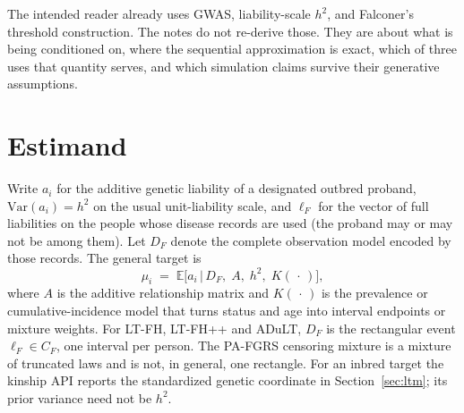 \documentclass[11pt,a4paper]{article}
\newcommand{\E}{\mathbb{E}}
\newcommand{\Var}{\mathrm{Var}}
\newcommand{\h}{h^{2}}
\begin{document}
\begin{abstract}
The association and personalisation figures describe optimistic,
model-specific scenarios, not proved upper bounds for register data:
a pin-versus-interval ablation keeps almost all of
the onset increment except at high prevalence, and pinning is
calibrated only when onset is the CIP inverse of liability.
They are not estimates of clinical utility.
On the locked comparison to the two public R packages
(Section~\ref{sec:ltfhplus}), ltpred is much more computationally
efficient at the same algorithm: LTFHPlus Gibbs takes
$6.79\pm 0.08\times$ the ltpred Gibbs wall-clock with four ltpred threads
against one R worker ($1.75\times$ at one thread each), and LTFGRS PA
takes $1418\pm 30\times$ the ltpred PA wall-clock.
\end{abstract}

\vspace{0.4em}
\noindent
The intended reader already uses GWAS, liability-scale \(\h\), and
Falconer's threshold construction. The notes do not re-derive those.
They are about what is being conditioned on, where the sequential
approximation is exact, which of three uses that quantity serves,
and which simulation claims survive their generative assumptions.

\section{Estimand}
\label{sec:estimand}

Write $a_i$ for the additive genetic liability of a designated
outbred proband, $\Var(a_i)=\h$ on the usual unit-liability scale, and
$\ell_F$ for the vector of full liabilities on the people whose
disease records are used (the proband may or may not be among them).
Let $D_F$ denote the complete observation model encoded by those
records. The general target is
\begin{equation}
  \mu_i
  \;=\;
  \E\!\bigl[a_i \,\big|\, D_F,\; A,\; \h,\; K(\,\cdot\,)\bigr],
  \label{eq:estimand}
\end{equation}
where $A$ is the additive relationship matrix and $K(\,\cdot\,)$ is
the prevalence or cumulative-incidence model that turns status and
age into interval endpoints or mixture weights. For LT-FH, LT-FH++
and ADuLT, $D_F$ is the rectangular event $\ell_F\in C_F$, one interval
per person. The PA-FGRS censoring mixture is a mixture of truncated
laws and is not, in general, one rectangle.
For an inbred target the kinship API reports the standardized genetic
coordinate in Section~\ref{sec:ltm}; its prior variance need not be $\h$.
\end{document}
